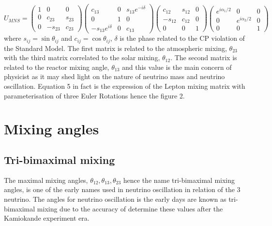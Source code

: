 \documentclass[11pt ,a4paper]{article}
\begin{document}
\begin{equation}
U_{MNS}=
\begin{pmatrix}
1&0&0\\0&c_{23}&s_{23}\\0&-s_{23}&c_{23}
\end{pmatrix}
\begin{pmatrix}
c_{13} & 0 & s_{13}e^{-i\delta}\\0&1&0\\-s_{13}e^{i\delta}&0&c_{13}
\end{pmatrix}
\begin{pmatrix}
c_{12}&s_{12}&0\\-s_{12}&c_{12}&0\\0&0&1
\end{pmatrix}
\begin{pmatrix}
e^{i\alpha_1/2}&0&0\\0&e^{i\alpha_2/2}&0\\0&0&1
\end{pmatrix}
\end{equation}
where \(s_{ij}=\sin{\theta_{ij}} \) and \(c_{ij}=\cos{\theta_{ij}} \),  \(\delta \) is the phase related to the CP violation of the Standard Model. The first matrix is related to the atmospheric mixing, \(\theta_{23} \) with the third matrix correlated to the solar mixing, \(\theta_{12} \). The second matrix is related to the reactor mixing angle, \(\theta_{13} \) and this value is the main concern of physicist as it may shed light on the nature of neutrino mass and neutrino oscillation. Equation 5 in fact is the expression of the Lepton mixing matrix with parameterisation of three Euler Rotations\cite{massmodel}\cite{constraint} hence the figure 2.

\section*{Mixing angles}
\subsection*{Tri-bimaximal mixing}
The maximal mixing angles, \(\theta_{12}, \theta_{13}, \theta_{23} \) hence the name tri-bimaximal mixing angles, is one of the early names used in neutrino oscillation in relation of the 3 neutrino.\cite{tip} The angles for neutrino oscillation is the early days are known as tri-bimaximal mixing due to the accuracy of determine these values after the Kamiokande experiment era.\cite{trip}
\end{document}
